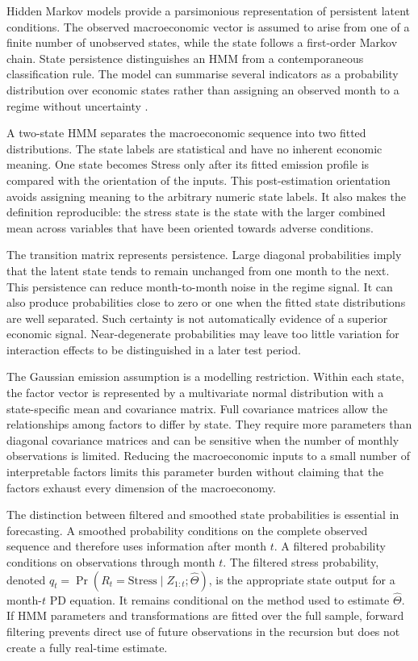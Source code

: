 Hidden Markov models provide a parsimonious representation of persistent latent conditions. The observed macroeconomic vector is assumed to arise from one of a finite number of unobserved states, while the state follows a first-order Markov chain. State persistence distinguishes an HMM from a contemporaneous classification rule. The model can summarise several indicators as a probability distribution over economic states rather than assigning an observed month to a regime without uncertainty \citep{rabiner1989hmm,hamilton1989regimes}.

A two-state HMM separates the macroeconomic sequence into two fitted distributions. The state labels are statistical and have no inherent economic meaning. One state becomes Stress only after its fitted emission profile is compared with the orientation of the inputs. This post-estimation orientation avoids assigning meaning to the arbitrary numeric state labels. It also makes the definition reproducible: the stress state is the state with the larger combined mean across variables that have been oriented towards adverse conditions.

The transition matrix represents persistence. Large diagonal probabilities imply that the latent state tends to remain unchanged from one month to the next. This persistence can reduce month-to-month noise in the regime signal. It can also produce probabilities close to zero or one when the fitted state distributions are well separated. Such certainty is not automatically evidence of a superior economic signal. Near-degenerate probabilities may leave too little variation for interaction effects to be distinguished in a later test period.

The Gaussian emission assumption is a modelling restriction. Within each state, the factor vector is represented by a multivariate normal distribution with a state-specific mean and covariance matrix. Full covariance matrices allow the relationships among factors to differ by state. They require more parameters than diagonal covariance matrices and can be sensitive when the number of monthly observations is limited. Reducing the macroeconomic inputs to a small number of interpretable factors limits this parameter burden without claiming that the factors exhaust every dimension of the macroeconomy.

The distinction between filtered and smoothed state probabilities is essential in forecasting. A smoothed probability conditions on the complete observed sequence and therefore uses information after month $t$. A filtered probability conditions on observations through month $t$. The filtered stress probability, denoted $q_t=\Pr(R_t=\text{Stress}\mid Z_{1:t};\widehat\Theta)$, is the appropriate state output for a month-$t$ PD equation. It remains conditional on the method used to estimate $\widehat\Theta$. If HMM parameters and transformations are fitted over the full sample, forward filtering prevents direct use of future observations in the recursion but does not create a fully real-time estimate.

